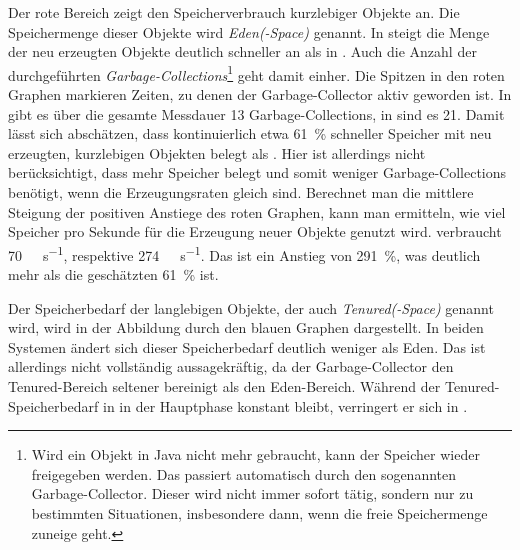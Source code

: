 Der rote Bereich zeigt den Speicherverbrauch kurzlebiger Objekte an. Die Speichermenge dieser Objekte wird \emph{Eden(-Space)} genannt. In \sysB{} steigt die Menge der neu erzeugten Objekte deutlich schneller an als in \sysA{}. Auch die Anzahl der durchgeführten \emph{Garbage-Collections}\footnote{Wird ein Objekt in Java nicht mehr gebraucht, kann der Speicher wieder freigegeben werden. Das passiert automatisch durch den sogenannten Garbage-Collector. Dieser wird nicht immer sofort tätig, sondern nur zu bestimmten Situationen, insbesondere dann, wenn die freie Speichermenge zuneige geht.} geht damit einher. Die Spitzen in den roten Graphen markieren Zeiten, zu denen der Garbage-Collector aktiv geworden ist. In \sysA{} gibt es über die gesamte Messdauer 13 Garbage-Collections, in \sysB{} sind es 21. Damit lässt sich abschätzen, dass \sysB{} kontinuierlich etwa \SI{61}{\percent} schneller Speicher mit neu erzeugten, kurzlebigen Objekten belegt als \sysA{}. Hier ist allerdings nicht berücksichtigt, dass \sysB{} mehr Speicher belegt und somit weniger Garbage-Collections benötigt, wenn die Erzeugungsraten gleich sind. Berechnet man die mittlere Steigung der positiven Anstiege des roten Graphen, kann man ermitteln, wie viel Speicher pro Sekunde für die Erzeugung neuer Objekte genutzt wird. \sysA{} verbraucht \SI{70}{\mega\byte\per\second}, \sysB{} respektive \SI{274}{\mega\byte\per\second}. Das ist ein Anstieg von \SI{291}{\percent}, was deutlich mehr als die geschätzten \SI{61}{\percent} ist.

Der Speicherbedarf der langlebigen Objekte, der auch \emph{Tenured(-Space)} genannt wird, wird in der Abbildung durch den blauen Graphen dargestellt. In beiden Systemen ändert sich dieser Speicherbedarf deutlich weniger als Eden. Das ist allerdings nicht vollständig aussagekräftig, da der Garbage-Collector den Tenured-Bereich seltener bereinigt als den Eden-Bereich. Während der Tenured-Speicherbedarf in \sysB{} in der Hauptphase konstant bleibt, verringert er sich in \sysA{}. 